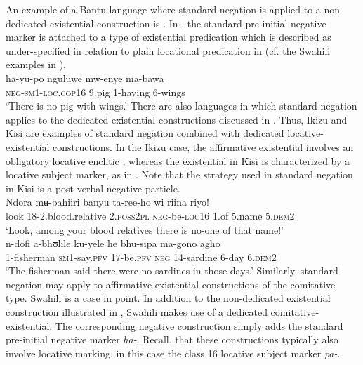 \documentclass[output=paper]{langscibook}
\begin{document}
An example of a Bantu language where standard negation is applied to a
non-dedicated existential construction is . In
, the standard pre-initial negative marker is attached
to a type of existential predication which is described as under-specified
in relation to plain locational predication in  (cf. the
Swahili examples in ).
\ea\label{ex:swahili-pig} \\
\gll ha-yu-po nguluwe mw-enye ma-bawa\\ \textsc{neg-sm1-loc.cop16} 9.pig
1-having 6-wings\\ \glt `There is no pig with wings.' \z There are also
languages in which standard negation applies to the dedicated existential
constructions discussed in . Thus, Ikizu and
Kisi are examples of standard negation combined with dedicated
locative-existential constructions. In the Ikizu case, the affirmative
existential involves an obligatory locative enclitic
, whereas the existential in Kisi is characterized
by a locative subject marker, as in . Note that the
strategy used in standard negation in Kisi is a post-verbal negative
particle.  \ea\label{ex:ikizu-relatives} \\ \gll Ndora mʉ-bahiiri banyu ta-ree-ho wi
riina riyo!\\ look 18-2.blood.relative 2.\textsc{poss2pl}
\textsc{neg}-be-\textsc{loc}16 1.of 5.name 5.\textsc{dem}2\\ \glt`Look,
among your blood relatives there is no-one of that name!' \z
\ea\label{ex:kisi-sardines} \\ \gll n-dofi a-bhʊlile ku-yele he bhu-sipa
ma-gono agho\\ 1-fisherman \textsc{sm1}-say.\textsc{pfv} 17-be.\textsc{pfv}
\textsc{neg} 14-sardine 6-day 6.\textsc{dem}2\\ \glt `The fisherman said
there were no sardines in those days.' \z 
%
Similarly, standard negation may apply to affirmative existential
constructions of the comitative type.  Swahili is a case in
point. In addition to the non-dedicated existential construction
illustrated in , Swahili makes use of a dedicated
co\-mi\-ta\-ti\-ve-exis\-ten\-tial. The corresponding negative 
construction simply adds the standard pre-initial negative marker \textit{ha-}. Recall, that these constructions typically also involve locative marking, in this case the class 16 locative subject marker \textit{pa-}.  %
\end{document}
